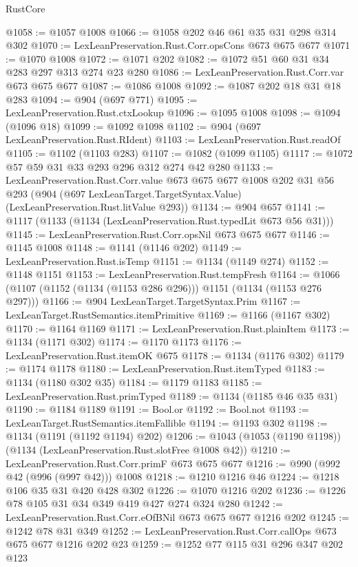 \begin{lexlean}{RustCore}
\begin{coremodule}
@1058 := @1057 @1008
@1066 := @1058 @202 @46 @61 @35 @31 @298 @314 @302
@1070 := LexLeanPreservation.Rust.Corr.opsCons @673 @675 @677
@1071 := @1070 @1008
@1072 := @1071 @202
@1082 := @1072 @51 @60 @31 @34 @283 @297 @313 @274 @23 @280
@1086 := LexLeanPreservation.Rust.Corr.var @673 @675 @677
@1087 := @1086 @1008
@1092 := @1087 @202 @18 @31 @18 @283
@1094 := @904 (@697 @771)
@1095 := LexLeanPreservation.Rust.ctxLookup
@1096 := @1095 @1008
@1098 := @1094 (@1096 @18)
@1099 := @1092 @1098
@1102 := @904 (@697 LexLeanPreservation.Rust.RIdent)
@1103 := LexLeanPreservation.Rust.readOf
@1105 := @1102 (@1103 @283)
@1107 := @1082 (@1099 @1105)
@1117 := @1072 @57 @59 @31 @33 @293 @296 @312 @274 @42 @280
@1133 := LexLeanPreservation.Rust.Corr.value
    @673
    @675
    @677
    @1008
    @202
    @31
    @56
    @293
    (@904 (@697 LexLeanTarget.TargetSyntax.Value) (LexLeanPreservation.Rust.litValue @293))
@1134 := @904 @657
@1141 := @1117 (@1133 (@1134 (LexLeanPreservation.Rust.typedLit @673 @56 @31)))
@1145 := LexLeanPreservation.Rust.Corr.opsNil @673 @675 @677
@1146 := @1145 @1008
@1148 := @1141 (@1146 @202)
@1149 := LexLeanPreservation.Rust.isTemp
@1151 := @1134 (@1149 @274)
@1152 := @1148 @1151
@1153 := LexLeanPreservation.Rust.tempFresh
@1164 := @1066 (@1107 (@1152 (@1134 (@1153 @286 @296))) @1151 (@1134 (@1153 @276 @297)))
@1166 := @904 LexLeanTarget.TargetSyntax.Prim
@1167 := LexLeanTarget.RustSemantics.itemPrimitive
@1169 := @1166 (@1167 @302)
@1170 := @1164 @1169
@1171 := LexLeanPreservation.Rust.plainItem
@1173 := @1134 (@1171 @302)
@1174 := @1170 @1173
@1176 := LexLeanPreservation.Rust.itemOK @675
@1178 := @1134 (@1176 @302)
@1179 := @1174 @1178
@1180 := LexLeanPreservation.Rust.itemTyped
@1183 := @1134 (@1180 @302 @35)
@1184 := @1179 @1183
@1185 := LexLeanPreservation.Rust.primTyped
@1189 := @1134 (@1185 @46 @35 @31)
@1190 := @1184 @1189
@1191 := Bool.or
@1192 := Bool.not
@1193 := LexLeanTarget.RustSemantics.itemFallible
@1194 := @1193 @302
@1198 := @1134 (@1191 (@1192 @1194) @202)
@1206 := @1043 (@1053 (@1190 @1198)) (@1134 (LexLeanPreservation.Rust.slotFree @1008 @42))
@1210 := LexLeanPreservation.Rust.Corr.primF @673 @675 @677
@1216 := @990 (@992 @42 (@996 (@997 @42))) @1008
@1218 := @1210 @1216 @46
@1224 := @1218 @106 @35 @31 @420 @428 @302
@1226 := @1070 @1216 @202
@1236 := @1226 @78 @105 @31 @34 @349 @419 @427 @274 @324 @280
@1242 := LexLeanPreservation.Rust.Corr.eOfBNil @673 @675 @677 @1216 @202
@1245 := @1242 @78 @31 @349
@1252 := LexLeanPreservation.Rust.Corr.callOps @673 @675 @677 @1216 @202 @23
@1259 := @1252 @77 @115 @31 @296 @347 @202 @123

\end{coremodule}
\end{lexlean}
